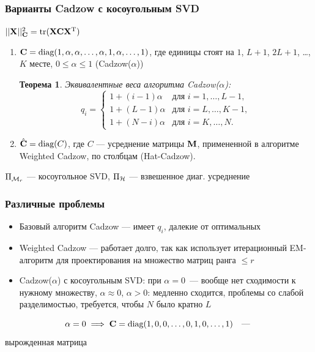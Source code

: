 \documentclass[unicode, notheorems]{beamer}
\newtheorem{theorem}{Теорема}
\begin{document}
\begin{frame}
    \frametitle{Варианты Cadzow с косоугольным SVD}
    $||\mathbf{X}||_{\mathbf{C}}^2 = \text{tr}(\mathbf{X} \mathbf{C} \mathbf{X}^{\mathrm{T}})$
    \begin{enumerate}
    \item $\mathbf{C} = \text{diag}(1, \alpha, \alpha, \ldots, \alpha, 1, \alpha, \ldots, 1)$,
где единицы стоят на $1$, $L + 1$, $2L + 1$, \ldots , $K$ месте, $0 \le \alpha \le 1$ (Cadzow($\alpha$))
    \begin{theorem}
    Эквивалентные веса алгоритма Cadzow($\alpha$):
\begin{equation*}
q_i = \begin{cases}
1 + (i - 1) \alpha & \text{для $i = 1, \ldots, L-1,$}\\
1 + (L - 1) \alpha & \text{для $i = L, \ldots, K-1,$}\\
1 + (N - i) \alpha & \text{для $i = K, \ldots, N.$}
\end{cases}
\end{equation*}
    \end{theorem}
    \item $\hat {\mathbf{C}} = \text{diag}(C)$, где $C$ --- усреднение матрицы $\mathbf{M}$, примененной в алгоритме Weighted Cadzow, по столбцам (Hat-Cadzow).
    \end{enumerate}
    
    $\Pi_{\mathcal{M}_r}$ --- косоугольное SVD, $\Pi_{\mathcal{H}}$ --- взвешенное диаг. усреднение
\end{frame}

\begin{frame}
    \frametitle{Различные проблемы}
    \begin{itemize}
    \item Базовый алгоритм Cadzow --- имеет $q_i$, далекие от оптимальных
    \item Weighted Cadzow --- работает долго, так как использует итерационный EM-алгоритм для проектирования на множество матриц ранга $\le r$
    \item Cadzow($\alpha$) с косоугольным SVD: при $\alpha = 0$~--- вообще нет сходимости к нужному множеству, $\alpha \approx 0$, $\alpha > 0$: медленно сходится, проблемы со слабой разделимостью, требуется, чтобы $N$ было кратно $L$
    \end{itemize}
    \begin{equation*}
    \alpha = 0 \implies \mathbf{C} = \text{diag}(1, 0, 0, \ldots, 0, 1, 0, \ldots, 1) \quad \text{--- }
    \end{equation*}
    вырожденная матрица
\end{frame}
\end{document}
